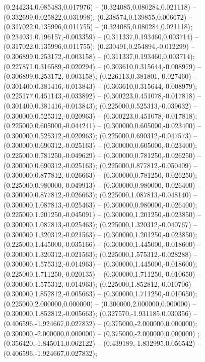  (0.244234,0.085483,0.017976) -- (0.324085,0.080284,0.021118) -- (0.332699,0.025822,0.031998);
 (0.238574,0.139855,0.006672) -- (0.317022,0.135996,0.011755) -- (0.324085,0.080284,0.021118);
 (0.234031,0.196157,-0.003359) -- (0.311337,0.193460,0.003714) -- (0.317022,0.135996,0.011755);
 (0.230491,0.254894,-0.012299) -- (0.306899,0.253172,-0.003158) -- (0.311337,0.193460,0.003714);
 (0.227871,0.316589,-0.020294) -- (0.303610,0.315644,-0.008979) -- (0.306899,0.253172,-0.003158);
 (0.226113,0.381801,-0.027460) -- (0.301400,0.381416,-0.013843) -- (0.303610,0.315644,-0.008979);
 (0.225177,0.451143,-0.033892) -- (0.300223,0.451078,-0.017818) -- (0.301400,0.381416,-0.013843);
 (0.225000,0.525313,-0.039632) -- (0.300000,0.525312,-0.020963) -- (0.300223,0.451078,-0.017818);
 (0.225000,0.605000,-0.044241) -- (0.300000,0.605000,-0.023400) -- (0.300000,0.525312,-0.020963);
 (0.225000,0.690312,-0.047573) -- (0.300000,0.690312,-0.025163) -- (0.300000,0.605000,-0.023400);
 (0.225000,0.781250,-0.049629) -- (0.300000,0.781250,-0.026250) -- (0.300000,0.690312,-0.025163);
 (0.225000,0.877812,-0.050409) -- (0.300000,0.877812,-0.026663) -- (0.300000,0.781250,-0.026250);
 (0.225000,0.980000,-0.049913) -- (0.300000,0.980000,-0.026400) -- (0.300000,0.877812,-0.026663);
 (0.225000,1.087813,-0.048140) -- (0.300000,1.087813,-0.025463) -- (0.300000,0.980000,-0.026400);
 (0.225000,1.201250,-0.045091) -- (0.300000,1.201250,-0.023850) -- (0.300000,1.087813,-0.025463);
 (0.225000,1.320312,-0.040767) -- (0.300000,1.320312,-0.021563) -- (0.300000,1.201250,-0.023850);
 (0.225000,1.445000,-0.035166) -- (0.300000,1.445000,-0.018600) -- (0.300000,1.320312,-0.021563);
 (0.225000,1.575312,-0.028288) -- (0.300000,1.575312,-0.014963) -- (0.300000,1.445000,-0.018600);
 (0.225000,1.711250,-0.020135) -- (0.300000,1.711250,-0.010650) -- (0.300000,1.575312,-0.014963);
 (0.225000,1.852812,-0.010706) -- (0.300000,1.852812,-0.005663) -- (0.300000,1.711250,-0.010650);
 (0.225000,2.000000,0.000000) -- (0.300000,2.000000,0.000000) -- (0.300000,1.852812,-0.005663);
 (0.327570,-1.931185,0.030356) -- (0.406596,-1.924667,0.027832) -- (0.375000,-2.000000,0.000000);
 (0.300000,-2.000000,0.000000) -- (0.375000,-2.000000,0.000000) ;
 (0.356420,-1.845011,0.062122) -- (0.439189,-1.832995,0.056542) -- (0.406596,-1.924667,0.027832);
